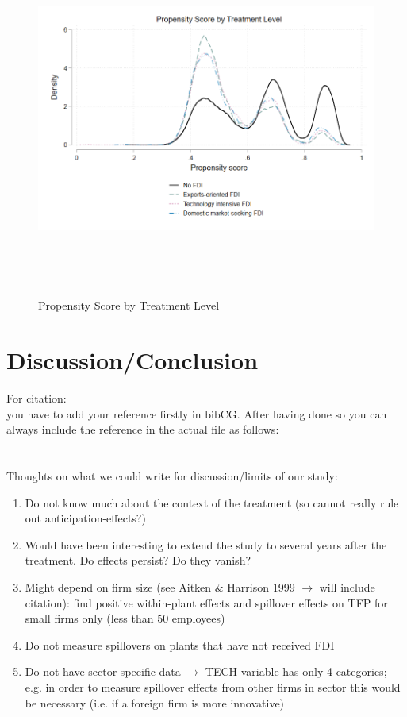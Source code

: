 \documentclass[a4paper,11pt]{scrartcl}
\begin{document}
\begin{figure}[h]\centering
\caption{Propensity Score by Treatment Level}
\includegraphics[height=11cm]{mlog_overl_ppb.png}\\[0.5cm] 
\label{fig:psbytype}
\end{figure}


\section{Discussion/Conclusion}
For citation: \\
you have to add your reference firstly in bibCG. After having done so you can always include the reference in the actual file as follows: \\
 \citet{biddle1990sleep}\\
\citep[p.~35]{CaliendoHujerThomsen2008}	 \\


Thoughts on what we could write for discussion/limits of our study: 
\begin{enumerate}
\item Do not know much about the context of the treatment (so cannot really rule out anticipation-effects?)
\item Would have been interesting to extend the study to several years after the treatment. Do effects persist? Do they vanish? 
\item Might depend on firm size (see Aitken \& Harrison 1999 $\rightarrow$ will include citation): find positive within-plant effects and spillover effects on TFP for small firms only (less than 50 employees)
\item Do not measure spillovers on plants that have not received FDI
\item Do not have sector-specific data $\rightarrow$ TECH variable has only 4 categories; e.g. in order to measure spillover effects from other firms in sector this would be necessary (i.e. if a foreign firm is more innovative)
\end{enumerate}
\end{document}
